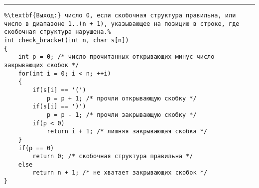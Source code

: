 \vspace{5pt} \hrule
\begin{lstlisting}[caption={Проверка правильности скобочной структуры}, label=p309, escapechar=\%]
%\noindent\textbf{Вход:} строка s: \textbf{array} [1..n] \textbf{of char}, возможно, содержащая скобки '(' и ')'.\\%
%\textbf{Выход:} число 0, если скобочная структура правильна, или число в диапазоне 1..(n + 1), указывающее на позицию в строке, где скобочная структура нарушена.%
int check_bracket(int n, char s[n])
{
	int p = 0; /* число прочитанных открывающих минус число закрывающих скобок */
	for(int i = 0; i < n; ++i)
	{
		if(s[i] == '(')
			p = p + 1; /* прочли открывающую скобку */
		if(s[i] == ')')
			p = p - 1; /* прочли закрывающую скобку */
		if(p < 0)
			return i + 1; /* лишняя закрывающая скобка */
	}
	if(p == 0)
		return 0; /* скобочная структура правильна */
	else
		return n + 1; /* не хватает закрывающих скобок */
}
\end{lstlisting}
